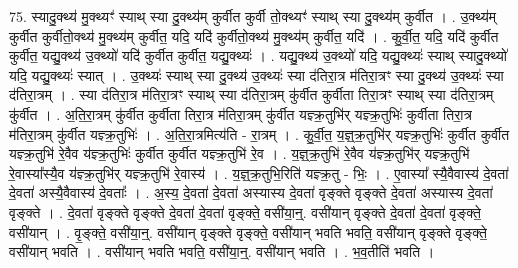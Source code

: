 \documentclass[17pt]{extarticle}
\begin{document}
75. स्यादु॒क्थ्य॑ मु॒क्थ्यꣳ॑ स्याथ् स्या दु॒क्थ्य॑म् कुर्वीत कुर्वी तो॒क्थ्यꣳ॑ स्याथ् स्या दु॒क्थ्य॑म् कुर्वीत । . उ॒क्थ्य॑म् कुर्वीत कुर्वीतो॒क्थ्य॑ मु॒क्थ्य॑म् कुर्वीत॒ यदि॒ यदि॑ कुर्वीतो॒क्थ्य॑ मु॒क्थ्य॑म् कुर्वीत॒ यदि॑ । . कु॒र्वी॒त॒ यदि॒ यदि॑ कुर्वीत कुर्वीत॒ यद्यु॒क्थ्य॑ उ॒क्थ्यो॑ यदि॑ कुर्वीत कुर्वीत॒ यद्यु॒क्थ्यः॑ । . यद्यु॒क्थ्य॑ उ॒क्थ्यो॑ यदि॒ यद्यु॒क्थ्यः॑ स्याथ् स्यादु॒क्थ्यो॑ यदि॒ यद्यु॒क्थ्यः॑ स्यात् । . उ॒क्थ्यः॑ स्याथ् स्या दु॒क्थ्य॑ उ॒क्थ्यः॑ स्या द॑तिरा॒त्र म॑तिरा॒त्रꣳ स्या दु॒क्थ्य॑ उ॒क्थ्यः॑ स्या द॑तिरा॒त्रम् । . स्या द॑तिरा॒त्र म॑तिरा॒त्रꣳ स्याथ् स्या द॑तिरा॒त्रम् कु॑र्वीत कुर्वीता तिरा॒त्रꣳ स्याथ् स्या द॑तिरा॒त्रम् कु॑र्वीत । . अ॒ति॒रा॒त्रम् कु॑र्वीत कुर्वीता तिरा॒त्र म॑तिरा॒त्रम् कु॑र्वीत यज्ञ्क्र॒तुभि॑र् यज्ञ्क्र॒तुभिः॑ कुर्वीता तिरा॒त्र म॑तिरा॒त्रम् कु॑र्वीत यज्ञ्क्र॒तुभिः॑ । . अ॒ति॒रा॒त्रमित्य॑ति - रा॒त्रम् । . कु॒र्वी॒त॒ य॒ज्ञ्॒क्र॒तुभि॑र् यज्ञ्क्र॒तुभिः॑ कुर्वीत कुर्वीत यज्ञ्क्र॒तुभि॑ रे॒वैव य॑ज्ञ्क्र॒तुभिः॑ कुर्वीत कुर्वीत यज्ञ्क्र॒तुभि॑ रे॒व । . य॒ज्ञ्॒क्र॒तुभि॑ रे॒वैव य॑ज्ञ्क्र॒तुभि॑र् यज्ञ्क्र॒तुभि॑ रे॒वास्या᳚स्यै॒व य॑ज्ञ्क्र॒तुभि॑र् यज्ञ्क्र॒तुभि॑ रे॒वास्य॑ । . य॒ज्ञ्॒क्र॒तुभि॒रिति॑ यज्ञ्क्र॒तु - भिः॒ । . ए॒वास्या᳚ स्यै॒वैवास्य॑ दे॒वता॑ दे॒वता॑ अस्यै॒वैवास्य॑ दे॒वताः᳚ । . अ॒स्य॒ दे॒वता॑ दे॒वता॑ अस्यास्य दे॒वता॑ वृङ्क्ते वृङ्क्ते दे॒वता॑ अस्यास्य दे॒वता॑ वृङ्क्ते । . दे॒वता॑ वृङ्क्ते वृङ्क्ते दे॒वता॑ दे॒वता॑ वृङ्क्ते॒ वसी॑या॒न्॒. वसी॑यान् वृङ्क्ते दे॒वता॑ दे॒वता॑ वृङ्क्ते॒ वसी॑यान् । . वृ॒ङ्क्ते॒ वसी॑या॒न्॒. वसी॑यान् वृङ्क्ते वृङ्क्ते॒ वसी॑यान् भवति भवति॒ वसी॑यान् वृङ्क्ते वृङ्क्ते॒ वसी॑यान् भवति । . वसी॑यान् भवति भवति॒ वसी॑या॒न्॒. वसी॑यान् भवति । . भ॒व॒तीति॑ भवति । \newline
\pagebreak
{}
\end{document}
